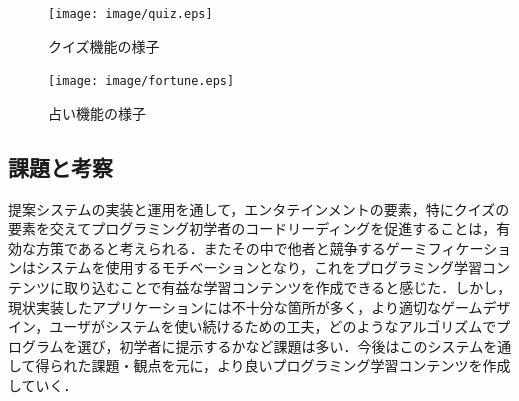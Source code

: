 \begin{figure}[!ht]
  \begin{center}
    \texttt{[image: image/quiz.eps]}
  \end{center}
    \vspace{-8mm} 
  \caption{クイズ機能の様子}
  \label{quiz}
\end{figure}

\begin{figure}[!ht]
  \begin{center}
    \texttt{[image: image/fortune.eps]}
  \end{center}
    \vspace{-8mm} 
  \caption{占い機能の様子}
  \label{fortune}
\end{figure}


\subsection{課題と考察}

提案システムの実装と運用を通して，エンタテインメントの要素，特にクイズの要素を交えてプログラミング初学者のコードリーディングを促進することは，有効な方策であると考えられる．またその中で他者と競争するゲーミフィケーションはシステムを使用するモチベーションとなり，これをプログラミング学習コンテンツに取り込むことで有益な学習コンテンツを作成できると感じた．しかし，現状実装したアプリケーションには不十分な箇所が多く，より適切なゲームデザイン，ユーザがシステムを使い続けるための工夫，どのようなアルゴリズムでプログラムを選び，初学者に提示するかなど課題は多い．今後はこのシステムを通して得られた課題・観点を元に，より良いプログラミング学習コンテンツを作成していく．
